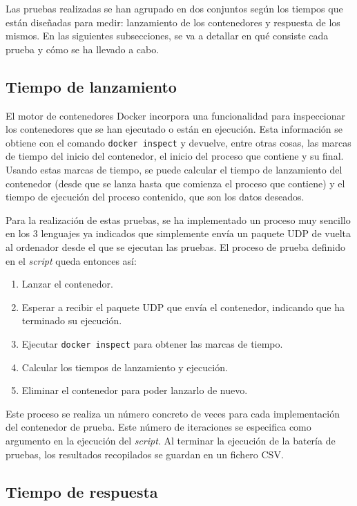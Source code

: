 Las pruebas realizadas se han agrupado en dos conjuntos según los tiempos que
están diseñadas para medir: lanzamiento de los contenedores y respuesta de los
mismos. En las siguientes subsecciones, se va a detallar en qué consiste cada
prueba y cómo se ha llevado a cabo.

\subsection{Tiempo de lanzamiento}

El motor de contenedores Docker incorpora una funcionalidad para inspeccionar
los contenedores que se han ejecutado o están en ejecución. Esta información se
obtiene con el comando \texttt{docker inspect} y devuelve, entre otras cosas,
las marcas de tiempo del inicio del contenedor, el inicio del proceso que
contiene y su final. Usando estas marcas de tiempo, se puede calcular el tiempo
de lanzamiento del contenedor (desde que se lanza hasta que comienza el proceso
que contiene) y el tiempo de ejecución del proceso contenido, que son los datos
deseados.

Para la realización de estas pruebas, se ha implementado un proceso muy sencillo
en los 3 lenguajes ya indicados que simplemente envía un paquete UDP de vuelta
al ordenador desde el que se ejecutan las pruebas. El proceso de prueba definido
en el \textit{script} queda entonces así:

\begin{enumerate}
      \item Lanzar el contenedor.
      \item Esperar a recibir el paquete UDP que envía el contenedor, indicando
            que ha terminado su ejecución.
      \item Ejecutar \texttt{docker inspect} para obtener las marcas de tiempo.
      \item Calcular los tiempos de lanzamiento y ejecución.
      \item Eliminar el contenedor para poder lanzarlo de nuevo.
\end{enumerate}

Este proceso se realiza un número concreto de veces para cada implementación del
contenedor de prueba. Este número de iteraciones se especifica como argumento en
la ejecución del \textit{script}. Al terminar la ejecución de la batería de
pruebas, los resultados recopilados se guardan en un fichero CSV.

\subsection{Tiempo de respuesta}

